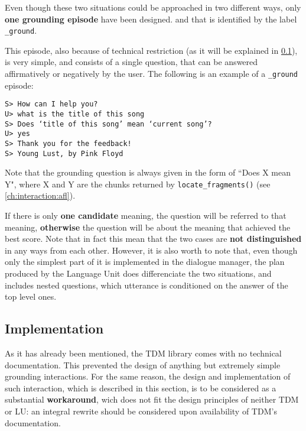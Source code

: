 Even though these two situations could be approached in two different ways, only \textbf{one grounding episode} have been designed. and that is identified by the label \texttt{\_ground}.

This episode, also because of technical restriction (as it will be explained in \ref{ch:interaction:episode:impl}), is very simple, and consists of a single question, that can be answered affirmatively or negatively by the user. The following is an example of a \texttt{\_ground} episode:

\texttt{S> How can I help you? \\
U> what is the title of this song \\
S> Does `title of this song' mean `current song'? \\
U> yes \\
S> Thank you for the feedback! \\
S> Young Lust, by Pink Floyd}

Note that the grounding question is always given in the form of ``Does X mean Y", where X and Y are the chunks returned by \texttt{locate\_fragments()} (see \ref{ch:interaction:afl}).

If there is only \textbf{one candidate} meaning, the question will be referred to that meaning, \textbf{otherwise} the question will be about the meaning that achieved the best score. Note that in fact this mean that the two cases are \textbf{not distinguished} in any ways from each other. However, it is also worth to note that, even though only the simplest part of it is implemented in the dialogue manager, the plan produced by the Language Unit does differenciate the two situations, and includes nested questions, which utterance is conditioned on the answer of the top level ones.

\subsection{Implementation} \label{ch:interaction:episode:impl}

As it has already been mentioned, the TDM library comes with no technical documentation. This prevented the design of anything but extremely simple grounding interactions. For the same reason, the design and implementation of such interaction, which is described in this section, is to be considered as a substantial \textbf{workaround}, wich does not fit the design principles of neither TDM or LU: an integral rewrite should be considered upon availability of TDM's documentation.

